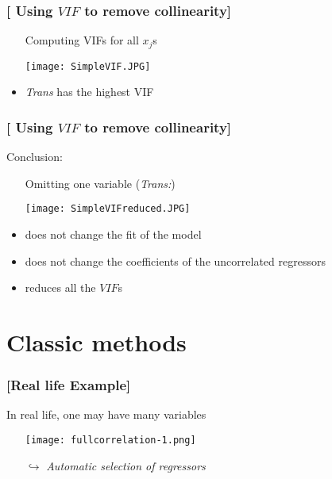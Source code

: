 \documentclass[xcolor=x11names,compress, aspectratio=169]{beamer}
\renewcommand{\(}{\begin{columns}}
\renewcommand{\)}{\end{columns}}
\newcommand{\<}[1]{\begin{column}{#1}}
\renewcommand{\>}{\end{column}}
\begin{document}
\begin{frame} %
\frametitle{\textcolor{brique}{[ Using $VIF$ to remove collinearity]}}
\pause
\begin{itemize}[<+->]
  \item[]Computing VIFs for all $x_j$s
  \item[] \texttt{[image: SimpleVIF.JPG]} \\
\item  \emph{Trans} has the highest VIF
\end{itemize}
\end{frame}

\begin{frame} %
\frametitle{\textcolor{brique}{[ Using $VIF$ to remove collinearity]}}
Conclusion:
\pause
\begin{itemize}[<+->]
  \item[] Omitting one variable (\textit{Trans:})
  \item[] \texttt{[image: SimpleVIFreduced.JPG]} \\
 \item  does not change the fit of the model
 \item  does not change the coefficients of the uncorrelated regressors
 \item reduces all the $VIF$s
\end{itemize}
\end{frame}

\section{Classic methods}

\begin{frame} %
\frametitle{\textcolor{brique}{[Real life Example]}}
In real life, one may have many variables
\pause
\begin{itemize}[<+->]
  \item[] \texttt{[image: fullcorrelation-1.png]}
  \item[$\hookrightarrow$] \textit{Automatic selection of regressors }
\end{itemize}
\end{frame}
\end{document}
